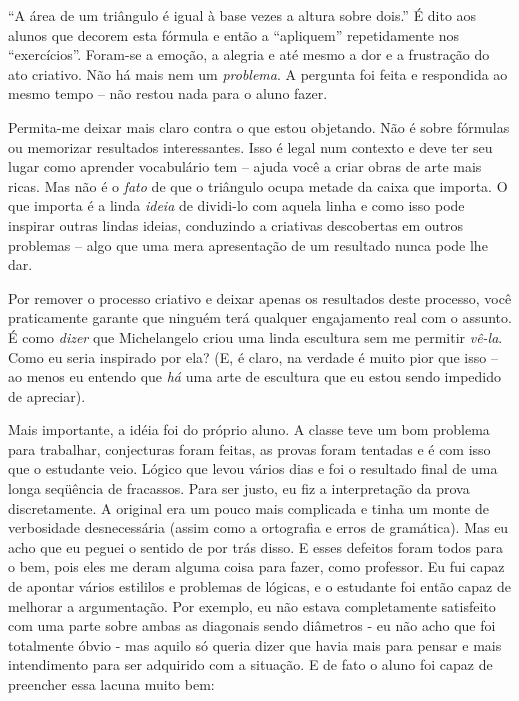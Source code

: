 \documentclass[a4paper,oneside,12pt,notitlepage]{article}
\begin{document}
\vspace{1em}

``A área de um triângulo é igual à base vezes a altura sobre dois.''
É dito aos alunos que decorem esta fórmula e então a ``apliquem'' repetidamente nos ``exercícios''.
Foram-se a emoção, a alegria e até mesmo a dor e a frustração do ato criativo.
Não há mais nem um \textsl{problema}.
A pergunta foi feita e respondida ao mesmo tempo -- não restou nada para o aluno fazer.

Permita-me deixar mais claro contra o que estou objetando.
Não é sobre fórmulas ou memorizar resultados interessantes.
Isso é legal num contexto e deve ter seu lugar como aprender vocabulário tem -- ajuda você a criar obras de arte mais ricas.
Mas não é o \textsl{fato} de que o triângulo ocupa metade da caixa que importa.
O que importa é a linda \textsl{ideia} de dividi-lo com aquela linha e como isso pode inspirar outras lindas ideias, conduzindo a criativas descobertas em outros problemas -- algo que uma mera apresentação de um resultado nunca pode lhe dar.

Por remover o processo criativo e deixar apenas os resultados deste processo, você praticamente garante que ninguém terá qualquer engajamento real com o assunto.
É como \textsl{dizer} que Michelangelo criou uma linda escultura sem me permitir \textsl{vê-la}.
Como eu seria inspirado por ela?
(E, é claro, na verdade é muito pior que isso -- ao menos eu entendo que \textsl{há} uma arte de escultura que eu estou sendo impedido de apreciar).












Mais importante, a idéia foi do próprio aluno. A classe teve um bom problema para trabalhar, conjecturas foram feitas, as provas foram tentadas e é com isso que o estudante veio. Lógico que levou vários dias e foi o resultado final de uma longa seqüência de fracassos.
Para ser justo, eu fiz a interpretação da prova discretamente. A original era um pouco mais complicada e tinha um monte de verbosidade desnecessária (assim como a ortografia e erros de gramática). Mas eu acho que eu peguei o sentido de por trás disso. E esses defeitos foram todos para o bem, pois eles me deram alguma coisa para fazer, como professor. Eu fui capaz de apontar vários estililos e problemas de lógicas, e o estudante foi então capaz de melhorar a argumentação. Por exemplo, eu não estava completamente satisfeito com uma parte sobre ambas as diagonais sendo diâmetros - eu não acho que foi totalmente óbvio - mas aquilo só queria dizer que havia mais para pensar e mais intendimento para
ser adquirido com a situação. E de fato o aluno foi capaz de preencher essa lacuna muito bem:
\end{document}
